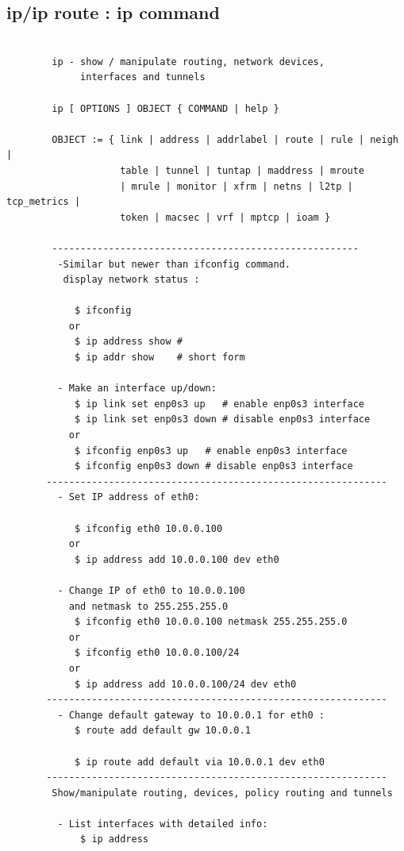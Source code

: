 \documentclass[a4paper,12pt]{article}
\begin{document}
\subsection{ip/ip route : ip command}
\begin{verbatim}
        
        ip - show / manipulate routing, network devices, 
             interfaces and tunnels
        
        ip [ OPTIONS ] OBJECT { COMMAND | help }
        
        OBJECT := { link | address | addrlabel | route | rule | neigh |           
                    table | tunnel | tuntap | maddress | mroute
                    | mrule | monitor | xfrm | netns | l2tp | tcp_metrics |  
                    token | macsec | vrf | mptcp | ioam }

        ------------------------------------------------------
         -Similar but newer than ifconfig command.
          display network status : 
        
            $ ifconfig
           or 
            $ ip address show # 
            $ ip addr show    # short form

         - Make an interface up/down:
            $ ip link set enp0s3 up   # enable enp0s3 interface
            $ ip link set enp0s3 down # disable enp0s3 interface     
           or 
            $ ifconfig enp0s3 up   # enable enp0s3 interface
            $ ifconfig enp0s3 down # disable enp0s3 interface           
       ------------------------------------------------------------    
         - Set IP address of eth0:
         
            $ ifconfig eth0 10.0.0.100
           or 
            $ ip address add 10.0.0.100 dev eth0

         - Change IP of eth0 to 10.0.0.100
           and netmask to 255.255.255.0
            $ ifconfig eth0 10.0.0.100 netmask 255.255.255.0
           or
            $ ifconfig eth0 10.0.0.100/24
           or
            $ ip address add 10.0.0.100/24 dev eth0         
       ------------------------------------------------------------    
         - Change default gateway to 10.0.0.1 for eth0 : 
            $ route add default gw 10.0.0.1
            
            $ ip route add default via 10.0.0.1 dev eth0
       ------------------------------------------------------------
        Show/manipulate routing, devices, policy routing and tunnels
        
         - List interfaces with detailed info:
             $ ip address
         

\end{verbatim}
\end{document}
